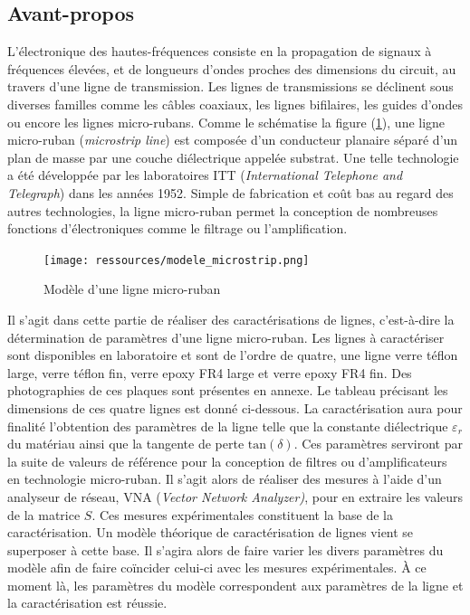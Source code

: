 \documentclass[french]{article}
\begin{document}
\subsection{Avant-propos}

L'électronique des hautes-fréquences consiste en la propagation de signaux à fréquences élevées, et de longueurs d'ondes proches des dimensions du circuit, au travers d'une ligne de transmission. Les lignes de transmissions se déclinent sous diverses familles comme les câbles coaxiaux, les lignes bifilaires, les guides d'ondes ou encore les lignes micro-rubans. Comme le schématise la figure (\ref{fig:modele_microstrip}), une ligne micro-ruban (\textit{microstrip line}) est composée d'un conducteur planaire séparé d'un plan de masse par une couche diélectrique appelée substrat. Une telle technologie a été développée par les laboratoires ITT (\textit{International Telephone and Telegraph}) dans les années 1952. Simple de fabrication et coût bas au regard des autres technologies, la ligne micro-ruban permet la conception de nombreuses fonctions d'électroniques comme le filtrage ou l'amplification.

\begin{figure}[H]
	\centering
	\texttt{[image: ressources/modele\_microstrip.png]}
	\caption{Modèle d'une ligne micro-ruban}
	\label{fig:modele_microstrip}
\end{figure}

Il s'agit dans cette partie de réaliser des caractérisations de lignes, c'est-à-dire la détermination de paramètres d'une ligne micro-ruban. Les lignes à caractériser sont disponibles en laboratoire et sont de l'ordre de quatre, une ligne verre téflon large, verre téflon fin, verre epoxy FR4 large et verre epoxy FR4 fin. Des photographies de ces plaques sont présentes en annexe. Le tableau précisant les dimensions de ces quatre lignes est donné ci-dessous. La caractérisation aura pour finalité l'obtention des paramètres de la ligne telle que la constante diélectrique $\varepsilon_r$ du matériau ainsi que la tangente de perte $\mbox{tan}(\delta)$. Ces paramètres serviront par la suite de valeurs de référence pour la conception de filtres ou d'amplificateurs en technologie micro-ruban. Il s'agit alors de réaliser des mesures à l'aide d'un analyseur de réseau, VNA (\textit{Vector Network Analyzer)}, pour en extraire les valeurs de la matrice $S$. Ces mesures expérimentales constituent la base de la caractérisation. Un modèle théorique de caractérisation de lignes vient se superposer à cette base. Il s'agira alors de faire varier les divers paramètres du modèle afin de faire coïncider celui-ci avec les mesures expérimentales. À ce moment là, les paramètres du modèle correspondent aux paramètres de la ligne et la caractérisation est réussie.
\end{document}
